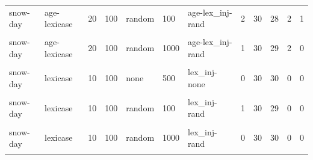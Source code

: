 \documentclass[
]{book}
\begin{document}
\begin{table}
\begin{tabular}{l|l|l|l|l|l|l|r|r|r|r|r}
\hline
\cellcolor{gray!6}{snow-day} & \cellcolor{gray!6}{age-lexicase} & \cellcolor{gray!6}{10} & \cellcolor{gray!6}{100} & \cellcolor{gray!6}{random} & \cellcolor{gray!6}{1000} & \cellcolor{gray!6}{age-lex\_inj-rand} & \cellcolor{gray!6}{2} & \cellcolor{gray!6}{30} & \cellcolor{gray!6}{28} & \cellcolor{gray!6}{9} & \cellcolor{gray!6}{0}\\
\hline
snow-day & age-lexicase & 20 & 100 & random & 100 & age-lex\_inj-rand & 2 & 30 & 28 & 2 & 1\\
\hline
\cellcolor{gray!6}{snow-day} & \cellcolor{gray!6}{age-lexicase} & \cellcolor{gray!6}{20} & \cellcolor{gray!6}{100} & \cellcolor{gray!6}{random} & \cellcolor{gray!6}{500} & \cellcolor{gray!6}{age-lex\_inj-rand} & \cellcolor{gray!6}{1} & \cellcolor{gray!6}{30} & \cellcolor{gray!6}{29} & \cellcolor{gray!6}{4} & \cellcolor{gray!6}{0}\\
\hline
snow-day & age-lexicase & 20 & 100 & random & 1000 & age-lex\_inj-rand & 1 & 30 & 29 & 2 & 0\\
\hline
\cellcolor{gray!6}{snow-day} & \cellcolor{gray!6}{lexicase} & \cellcolor{gray!6}{10} & \cellcolor{gray!6}{100} & \cellcolor{gray!6}{none} & \cellcolor{gray!6}{100} & \cellcolor{gray!6}{lex\_inj-none} & \cellcolor{gray!6}{0} & \cellcolor{gray!6}{30} & \cellcolor{gray!6}{30} & \cellcolor{gray!6}{0} & \cellcolor{gray!6}{0}\\
\hline
snow-day & lexicase & 10 & 100 & none & 500 & lex\_inj-none & 0 & 30 & 30 & 0 & 0\\
\hline
\cellcolor{gray!6}{snow-day} & \cellcolor{gray!6}{lexicase} & \cellcolor{gray!6}{10} & \cellcolor{gray!6}{100} & \cellcolor{gray!6}{none} & \cellcolor{gray!6}{1000} & \cellcolor{gray!6}{lex\_inj-none} & \cellcolor{gray!6}{0} & \cellcolor{gray!6}{30} & \cellcolor{gray!6}{30} & \cellcolor{gray!6}{0} & \cellcolor{gray!6}{0}\\
\hline
snow-day & lexicase & 10 & 100 & random & 100 & lex\_inj-rand & 1 & 30 & 29 & 0 & 0\\
\hline
\cellcolor{gray!6}{snow-day} & \cellcolor{gray!6}{lexicase} & \cellcolor{gray!6}{10} & \cellcolor{gray!6}{100} & \cellcolor{gray!6}{random} & \cellcolor{gray!6}{500} & \cellcolor{gray!6}{lex\_inj-rand} & \cellcolor{gray!6}{3} & \cellcolor{gray!6}{30} & \cellcolor{gray!6}{27} & \cellcolor{gray!6}{0} & \cellcolor{gray!6}{0}\\
\hline
snow-day & lexicase & 10 & 100 & random & 1000 & lex\_inj-rand & 0 & 30 & 30 & 0 & 0\\
\hline
\cellcolor{gray!6}{snow-day} & \cellcolor{gray!6}{lexicase} & \cellcolor{gray!6}{20} & \cellcolor{gray!6}{100} & \cellcolor{gray!6}{none} & \cellcolor{gray!6}{100} & \cellcolor{gray!6}{lex\_inj-none} & \cellcolor{gray!6}{0} & \cellcolor{gray!6}{30} & \cellcolor{gray!6}{30} & \cellcolor{gray!6}{0} & \cellcolor{gray!6}{0}\\

\end{tabular}
\end{table}
\end{document}
